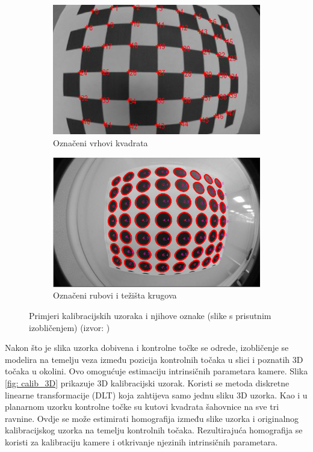 \documentclass[../seminar.tex]{subfiles}
\begin{document}
\begin{figure}[ht!]
\begin{subfigure}[b]{0.483\textwidth}
            \includegraphics[width=\textwidth]{img_005_calib_sq_marked_01_crop.png}
            \caption[]%
            {{\small Označeni vrhovi kvadrata}}    
            \label{fig:calib_patterns_sq_marked}
        \end{subfigure}
        \quad
        \begin{subfigure}[b]{0.483\textwidth}   
            \centering 
            \includegraphics[width=\textwidth]{img_005_calib_circles_marked_01.png}
            \caption[]%
            {{\small Označeni rubovi i težišta krugova}}    
            \label{fig:calib_patterns_circles_marked}
        \end{subfigure}
        \caption[ ]
        {\small Primjeri kalibracijskih uzoraka i njihove oznake (slike s prisutnim izobličenjem) (izvor: \cite{Kashyap})} 
        \label{fig: calib_patterns}
    \end{figure}

Nakon što je slika uzorka dobivena i kontrolne točke se odrede, izobličenje se modelira na temelju veza između pozicija kontrolnih točaka u slici i poznatih 3D točaka u okolini. Ovo omogućuje estimaciju intrinsičnih parametara kamere.
Slika \ref{fig: calib_3D} prikazuje 3D kalibracijski uzorak. Koristi se metoda diskretne linearne transformacije (DLT) koja zahtijeva samo jednu sliku 3D uzorka. Kao i u planarnom uzorku kontrolne točke su kutovi kvadrata šahovnice na sve tri ravnine. Ovdje se može estimirati homografija između slike uzorka i originalnog kalibracijskog uzorka na temelju kontrolnih točaka. Rezultirajuća homografija  se koristi za kalibraciju kamere i otkrivanje njezinih intrinsičnih parametara.
\end{document}
